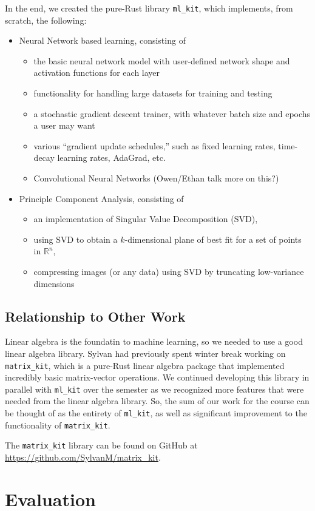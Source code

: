 \documentclass[12pt, letterpaper]{article}
\theoremstyle{definition}
\theoremstyle{remark}
\newcommand{\R}{\mathbb{R}}
\begin{document}
In the end, we created the pure-Rust library \texttt{ml\_kit}, which implements, from scratch, the following:
\begin{itemize}
    \item Neural Network based learning, consisting of
    \begin{itemize}
        \item the basic neural network model with user-defined network shape and activation functions 
        for each layer
        \item functionality for handling large datasets for training and testing
        \item a stochastic gradient descent trainer, with whatever batch size and epochs a user may want
        \item various ``gradient update schedules,'' such as fixed learning rates, time-decay learning rates, AdaGrad, etc.
        \item Convolutional Neural Networks (Owen/Ethan talk more on this?)
    \end{itemize}
    \item Principle Component Analysis, consisting of
    \begin{itemize}
        \item an implementation of Singular Value Decomposition (SVD),
        \item using SVD to obtain a $k$-dimensional plane of best fit for a set of points in $\R^n$,
        \item compressing images (or any data) using SVD by truncating low-variance dimensions
    \end{itemize}
\end{itemize}





\subsection{Relationship to Other Work}

Linear algebra is the foundatin to machine learning, so we needed to use a good linear algebra library. Sylvan had 
previously spent winter break working on \texttt{matrix\_kit}, which is a pure-Rust linear algebra package that 
implemented incredibly basic matrix-vector operations. We continued developing this library in parallel with 
\texttt{ml\_kit} over the semester as we recognized more features that were needed from the linear algebra library. 
So, the sum of our work for the course can be thought of as the entirety of \texttt{ml\_kit}, as well as significant
improvement to the functionality of \texttt{matrix\_kit}.

The \texttt{matrix\_kit} library can be found on GitHub at \url{https://github.com/SylvanM/matrix_kit}.

\section{Evaluation}





\printbibliography
\end{document}
